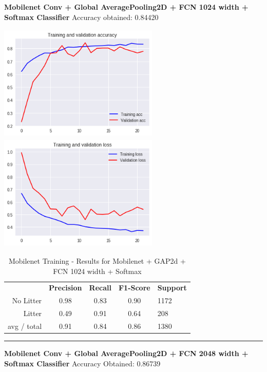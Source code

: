 \documentclass{IEEEtran}
\begin{document}
\bigskip

\textbf{Mobilenet Conv + Global AveragePooling2D + FCN 1024 width + Softmax Classifier}\newline
Accuracy obtained: 0.84420

 \includegraphics[width=3in,height=2.18in]{mobile/mobilenet-img005.png} 
\includegraphics[width=3in,height=2.18in]{mobile/mobilenet-img006.png} 


\bigskip

\begin{table}[ht]
\centering
\caption{Mobilenet Training - Results for Mobilenet + GAP2d + FCN 1024 width + Softmax}
\label{mobilenet1}
\begin{tabular}{rcccl}
\textbf{}   & \textbf{Precision} & \textbf{Recall} & \textbf{F1-Score} & \textbf{Support} \\
No Litter   & 0.98 &0.83 & 0.90 & 1172 \\
Litter      & 0.49 &0.91 & 0.64 & 208 \\
avg / total & 0.91 &0.84 & 0.86 & 1380 \\
\end{tabular}
\begin{center}\noindent\rule{10cm}{0.4pt}\end{center}
\end{table}


\bigskip

\textbf{Mobilenet Conv + Global AveragePooling2D + FCN 2048 width + Softmax Classifier}\newline
Accuracy Obtained: 0.86739
\end{document}
